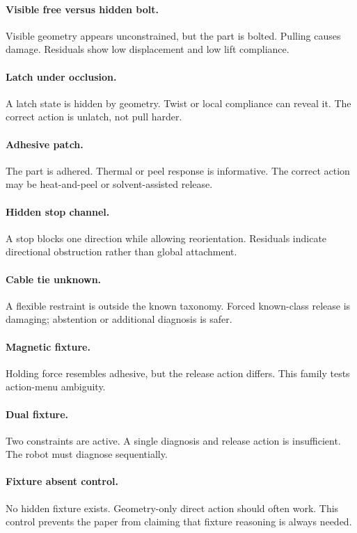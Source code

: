 \documentclass{article}
\begin{document}
\paragraph{Visible free versus hidden bolt.}
Visible geometry appears unconstrained, but the part is bolted. Pulling causes
damage. Residuals show low displacement and low lift compliance.

\paragraph{Latch under occlusion.}
A latch state is hidden by geometry. Twist or local compliance can reveal it.
The correct action is unlatch, not pull harder.

\paragraph{Adhesive patch.}
The part is adhered. Thermal or peel response is informative. The correct
action may be heat-and-peel or solvent-assisted release.

\paragraph{Hidden stop channel.}
A stop blocks one direction while allowing reorientation. Residuals indicate
directional obstruction rather than global attachment.

\paragraph{Cable tie unknown.}
A flexible restraint is outside the known taxonomy. Forced known-class
release is damaging; abstention or additional diagnosis is safer.

\paragraph{Magnetic fixture.}
Holding force resembles adhesive, but the release action differs. This family
tests action-menu ambiguity.

\paragraph{Dual fixture.}
Two constraints are active. A single diagnosis and release action is
insufficient. The robot must diagnose sequentially.

\paragraph{Fixture absent control.}
No hidden fixture exists. Geometry-only direct action should often work. This
control prevents the paper from claiming that fixture reasoning is always
needed.
\end{document}
